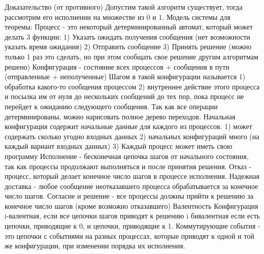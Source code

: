 Доказательство (от противного)
Допустим такой алгоритм существует, тогда рассмотрим его исполнении на множестве из 0 и 1.
Модель системы для теоремы:
Процесс - это некоторый детерминированный автомат, который может делать 3 функции:
1) Указать ожидать получения сообщения (нет возможности указать время ожидания)
2) Отправить сообщение
3) Принять решение (можно только 1 раз это сделать, но при этом сообщать свое решение другим алгоритмам решено)
Конфигурация - состояние всех процессов + сообщения в пути (отправленные + неполученные)
Шагом в такой конфигурации называется 
1) обработка какого-то сообщения процессом
2) внутреннее действие этого процесса и посылка им от нуля до нескольких сообщений до тех пор, пока процесс не перейдет к ожиданию следующего сообщения.
Так как все операции детерминированы, можно нарисовать полное дерево переходов.
Начальная конфигурация содержит начальные данные для каждого из процессов.
1) может содержать сколько угодно входных данных
2) начальных конфигураций много (на каждый вариант входных данных)
3) Каждый процесс может иметь свою программу
Исполнение - бесконечная цепочка шагов от начального состояния, так как процессы продолжают выполняться и после принятия решения.
Отказ - процесс, который делает конечное число шагов в процессе исполнения.
Надежная доставка - любое сообщение неотказавшего процесса обрабатывается за конечное число шагов.
Согласие и решение - все процессы должны прийти к решению за конечное число шагов (кроме возможно отказавшего)
Валентность
Конфигурация i-валентная, если все цепочки шагов приводят к решению i
бивалентная если есть цепочки, приводящие к 0, и цепочки, приводящие к 1.
Коммутирующие события - это цепочки с событиями на разных процессах, которые приводят к одной и той же конфигурации, при изменении порядка их исполнения.

